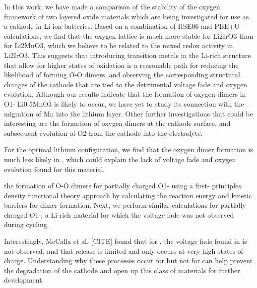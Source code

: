 \begin{refsection}
In this work, we have made a comparison of the stability of the oxygen 
framework of two layered oxide materials which are being investigated for use 
as a cathode in Li-ion batteries. Based on a combination of HSE06 and PBE+U 
calculations, we find that the oxygen lattice is much more stable for Li2IrO3 
than for Li2MnO3, which we believe to be related to the mixed redox activity 
in Li2IrO3. This suggests that introducing transition metals in the Li-rich 
structure that allow for higher states of oxidation is a reasonable path for 
reducing the likelihood of forming O-O dimers, and observing the corresponding 
structural changes of the cathode that are tied to the detrimental voltage 
fade and oxygen evolution. Although our results indicate that the formation of 
oxygen dimers in O1- Li0.5MnO3 is likely to occur, we have yet to study its 
connection with the migration of Mn into the lithium layer. Other further 
investigations that could be interesting are the formation of oxygen dimers at 
the cathode surface, and subsequent evolution of O2 from the cathode into the 
electrolyte. 
 
For the optimal lithium configuration, we find that the oxygen dimer formation 
is much less likely in , which could explain the lack of voltage 
fade and oxygen evolution found for this material. 
 
the formation of O-O dimers for partially charged O1- using a 
first- principles density functional theory approach by calculating the 
reaction energy and kinetic barriers for dimer formation. Next, we perform 
similar calculations for partially charged O1-, a Li-rich material 
for which the voltage fade was not observed during cycling.  
 
Interestingly, McCalla et al. [CITE] found that for , the voltage 
fade found in  is not observed, and that  release is 
limited and only occurs at very high states of charge. Understanding why these 
processes occur for  but not for  can help prevent the 
degradation of the cathode and open up this class of materials for further 
development. 
 
\printbibliography 
\end{refsection} 